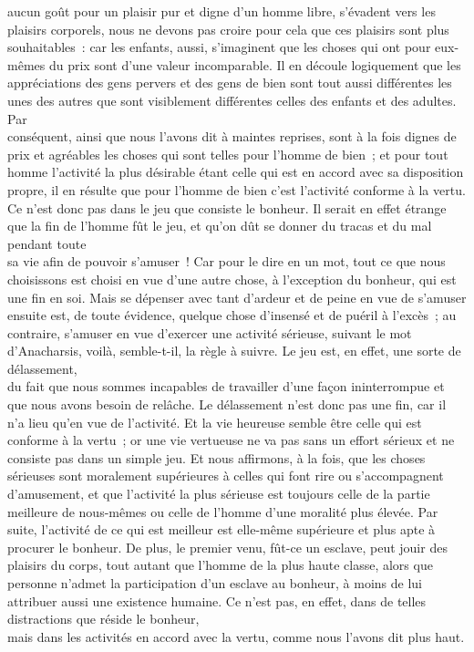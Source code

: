 \documentclass[french,twoside]{book} %
\begin{document}
aucun goût pour un plaisir pur et digne d’un homme libre, s’évadent vers les plaisirs corporels, nous ne devons pas croire pour cela que ces plaisirs sont plus souhaitables : car les enfants, aussi, s’imaginent que les choses qui ont pour eux-mêmes du prix sont d’une valeur incomparable. Il en découle logiquement que les appréciations des gens pervers et des gens de bien sont tout aussi différentes les unes des autres que sont visiblement différentes celles des enfants et des adultes. Par \\
conséquent, ainsi que nous l’avons dit à maintes reprises, sont à la fois dignes de prix et agréables les choses qui sont telles pour l’homme de bien ; et pour tout homme l’activité la plus désirable étant celle qui est en accord avec sa disposition propre, il en résulte que pour l’homme de bien c’est l’activité conforme à la vertu. Ce n’est donc pas dans le jeu que consiste le bonheur. Il serait en effet étrange que la fin de l’homme fût le jeu, et qu’on dût se donner du tracas et du mal pendant toute \\
sa vie afin de pouvoir s’amuser ! Car pour le dire en un mot, tout ce que nous choisissons est choisi en vue d’une autre chose, à l’exception du bonheur, qui est une fin en soi. Mais se dépenser avec tant d’ardeur et de peine en vue de s’amuser ensuite est, de toute évidence, quelque chose d’insensé et de puéril à l’excès ; au contraire, s’amuser en vue d’exercer une activité sérieuse, suivant le mot d’Anacharsis, voilà, semble-t-il, la règle à suivre. Le jeu est, en effet, une sorte de délassement, \\
du fait que nous sommes incapables de travailler d’une façon ininterrompue et que nous avons besoin de relâche. Le  délassement n’est donc pas une fin, car il n’a lieu qu’en vue de l’activité. Et la vie heureuse semble être celle qui est conforme à la vertu ; or une vie vertueuse ne va pas sans un effort sérieux et ne consiste pas dans un simple jeu. Et nous affirmons, à la fois, que les choses sérieuses sont moralement supérieures à celles qui font rire ou s’accompagnent d’amusement, et que l’activité la plus sérieuse est toujours celle de la partie \\
meilleure de nous-mêmes ou celle de l’homme d’une moralité plus élevée. Par suite, l’activité de ce qui est meilleur est elle-même supérieure et plus apte à procurer le bonheur. De plus, le premier venu, fût-ce un esclave, peut jouir des plaisirs du corps, tout autant que l’homme de la plus haute classe, alors que personne n’admet la participation d’un esclave au bonheur, à moins de lui attribuer aussi une existence humaine. Ce n’est pas, en effet, dans de telles distractions que réside le bonheur, \\
mais dans les activités en accord avec la vertu, comme nous l’avons dit plus haut.
\end{document}
